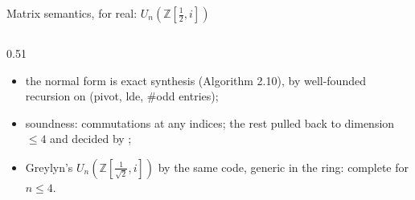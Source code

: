 \begin{frame}{Matrix semantics, for real: $U_n(\mathbb{Z}[\frac12,i])$ \New}
\begin{columns}[c]
\begin{column}{0.51\textwidth}
\begin{code}[hide]
\AgdaSymbol{=}\AgdaSpace{}%
\AgdaSymbol{\AgdaUnderscore{}}\<%
\end{code}
\begin{itemize}
  \small
  \item the normal form is \alert{exact synthesis} (Algorithm 2.10), by
        well-founded recursion on (pivot, lde, \#odd entries);
  \item soundness: commutations at any indices; the rest pulled back to
        dimension $\le4$ and decided by ;
  \item Greylyn's $U_n(\mathbb{Z}[\frac1{\sqrt2},i])$ by the same code, generic in
        the ring: complete for $n\le4$.
\end{itemize}
\end{column}
\end{columns}
\end{frame}

